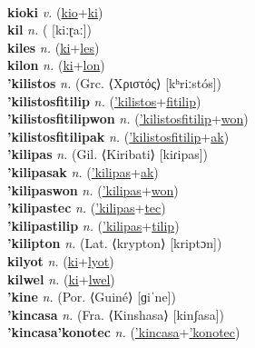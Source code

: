  \label{kiolon} \\
\textbf{kioki} \textit{v.} (\hyperref[kio]{kio}+\hyperref[ki]{ki})
 \label{kioki} \\
\textbf{kil} \textit{n.} ( [kiːɽaː])
 \label{kil} \\
\textbf{kiles} \textit{n.} (\hyperref[ki]{ki}+\hyperref[les]{les})
 \label{kiles} \\
\textbf{kilon} \textit{n.} (\hyperref[ki]{ki}+\hyperref[lon]{lon})
 \label{kilon} \\
\textbf{'kilistos} \textit{n.} (Grc. ⟨Χριστός⟩ [kʰriːstós])
 \label{'kilistos} \\
\textbf{'kilistosfitilip} \textit{n.} (\hyperref['kilistos]{'kilistos}+\hyperref[fitilip]{fitilip})
 \label{'kilistosfitilip} \\
\textbf{'kilistosfitilipwon} \textit{n.} (\hyperref['kilistosfitilip]{'kilistosfitilip}+\hyperref[won]{won})
 \label{'kilistosfitilipwon} \\
\textbf{'kilistosfitilipak} \textit{n.} (\hyperref['kilistosfitilip]{'kilistosfitilip}+\hyperref[ak]{ak})
 \label{'kilistosfitilipak} \\
\textbf{'kilipas} \textit{n.} (Gil. ⟨Kiribati⟩ [kiɾipas])
 \label{'kilipas} \\
\textbf{'kilipasak} \textit{n.} (\hyperref['kilipas]{'kilipas}+\hyperref[ak]{ak})
 \label{'kilipasak} \\
\textbf{'kilipaswon} \textit{n.} (\hyperref['kilipas]{'kilipas}+\hyperref[won]{won})
 \label{'kilipaswon} \\
\textbf{'kilipastec} \textit{n.} (\hyperref['kilipas]{'kilipas}+\hyperref[tec]{tec})
 \label{'kilipastec} \\
\textbf{'kilipastilip} \textit{n.} (\hyperref['kilipas]{'kilipas}+\hyperref[tilip]{tilip})
 \label{'kilipastilip} \\
\textbf{'kilipton} \textit{n.} (Lat. ⟨krypton⟩ [kriptɔn])
 \label{'kilipton} \\
\textbf{kilyot} \textit{n.} (\hyperref[ki]{ki}+\hyperref[lyot]{lyot})
 \label{kilyot} \\
\textbf{kilwel} \textit{n.} (\hyperref[ki]{ki}+\hyperref[lwel]{lwel})
 \label{kilwel} \\
\textbf{'kine} \textit{n.} (Por. ⟨Guiné⟩ [ɡiˈne])
 \label{'kine} \\
\textbf{'kincasa} \textit{n.} (Fra. ⟨Kinshasa⟩ [kinʃasa])
 \label{'kincasa} \\
\textbf{'kincasa'konotec} \textit{n.} (\hyperref['kincasa]{'kincasa}+\hyperref['konotec]{'konotec})
